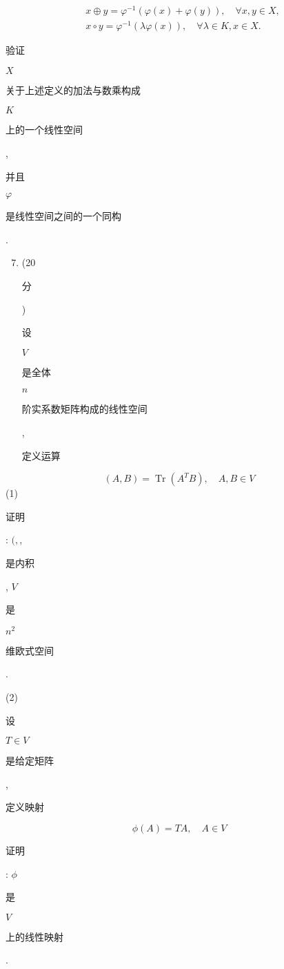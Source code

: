 \documentclass[10pt]{article}
\begin{document}
$$
\begin{aligned}
&x \oplus y=\varphi^{-1}(\varphi(x)+\varphi(y)), \quad \forall x, y \in X, \\
&x \circ y=\varphi^{-1}(\lambda \varphi(x)), \quad \forall \lambda \in K, x \in X .
\end{aligned}
$$
\begin{CJK}{UTF8}{mj}验证\end{CJK} $X$ \begin{CJK}{UTF8}{mj}关于上述定义的加法与数乘构成\end{CJK} $K$ \begin{CJK}{UTF8}{mj}上的一个线性空间\end{CJK},\begin{CJK}{UTF8}{mj}并且\end{CJK} $\varphi$ \begin{CJK}{UTF8}{mj}是线性空间之间的一个同构\end{CJK}.

\begin{enumerate}
  \setcounter{enumi}{6}
  \item (20 \begin{CJK}{UTF8}{mj}分\end{CJK}) \begin{CJK}{UTF8}{mj}设\end{CJK} $V$ \begin{CJK}{UTF8}{mj}是全体\end{CJK} $n$ \begin{CJK}{UTF8}{mj}阶实系数矩阵构成的线性空间\end{CJK}, \begin{CJK}{UTF8}{mj}定义运算\end{CJK}
\end{enumerate}
$$
(A, B)=\operatorname{Tr}\left(A^{T} B\right), \quad A, B \in V
$$
(1) \begin{CJK}{UTF8}{mj}证明\end{CJK}: $(,$, \begin{CJK}{UTF8}{mj}是内积\end{CJK}, $V$ \begin{CJK}{UTF8}{mj}是\end{CJK} $n^{2}$ \begin{CJK}{UTF8}{mj}维欧式空间\end{CJK}.

(2) \begin{CJK}{UTF8}{mj}设\end{CJK} $T \in V$ \begin{CJK}{UTF8}{mj}是给定矩阵\end{CJK}, \begin{CJK}{UTF8}{mj}定义映射\end{CJK}
$$
\phi(A)=T A, \quad A \in V
$$
\begin{CJK}{UTF8}{mj}证明\end{CJK}: $\phi$ \begin{CJK}{UTF8}{mj}是\end{CJK} $V$ \begin{CJK}{UTF8}{mj}上的线性映射\end{CJK}.
\end{document}
